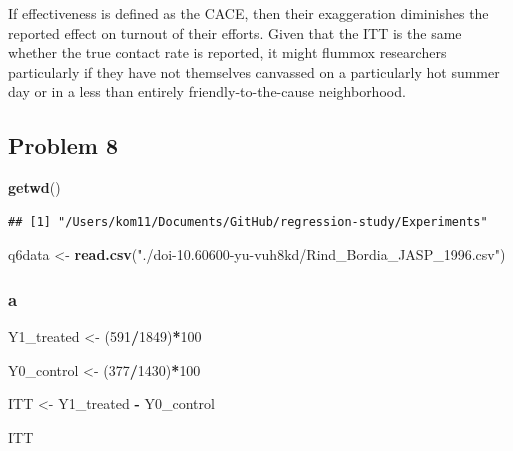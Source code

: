 \documentclass[
]{article}
\newenvironment{Shaded}{\begin{snugshade}}{\end{snugshade}}
\newcommand{\DecValTok}[1]{\textcolor[rgb]{0.00,0.00,0.81}{#1}}
\newcommand{\FunctionTok}[1]{\textcolor[rgb]{0.13,0.29,0.53}{\textbf{#1}}}
\newcommand{\NormalTok}[1]{#1}
\newcommand{\OtherTok}[1]{\textcolor[rgb]{0.56,0.35,0.01}{#1}}
\newcommand{\SpecialCharTok}[1]{\textcolor[rgb]{0.81,0.36,0.00}{\textbf{#1}}}
\newcommand{\StringTok}[1]{\textcolor[rgb]{0.31,0.60,0.02}{#1}}
\begin{document}
If effectiveness is defined as the CACE, then their exaggeration
diminishes the reported effect on turnout of their efforts. Given that
the ITT is the same whether the true contact rate is reported, it might
flummox researchers particularly if they have not themselves canvassed
on a particularly hot summer day or in a less than entirely
friendly-to-the-cause neighborhood.

\subsection{Problem 8}\label{problem-8}

\begin{Shaded}
\begin{Highlighting}[]
\FunctionTok{getwd}\NormalTok{()}
\end{Highlighting}
\end{Shaded}

\begin{verbatim}
## [1] "/Users/kom11/Documents/GitHub/regression-study/Experiments"
\end{verbatim}

\begin{Shaded}
\begin{Highlighting}[]
\NormalTok{q6data }\OtherTok{\textless{}{-}} \FunctionTok{read.csv}\NormalTok{(}\StringTok{"./doi{-}10.60600{-}yu{-}vuh8kd/Rind\_Bordia\_JASP\_1996.csv"}\NormalTok{)}
\end{Highlighting}
\end{Shaded}

\subsubsection{a}\label{a-3}

\begin{Shaded}
\begin{Highlighting}[]
\NormalTok{Y1\_treated }\OtherTok{\textless{}{-}}\NormalTok{ (}\DecValTok{591}\SpecialCharTok{/}\DecValTok{1849}\NormalTok{)}\SpecialCharTok{*}\DecValTok{100}

\NormalTok{Y0\_control }\OtherTok{\textless{}{-}}\NormalTok{ (}\DecValTok{377}\SpecialCharTok{/}\DecValTok{1430}\NormalTok{)}\SpecialCharTok{*}\DecValTok{100}

\NormalTok{ITT }\OtherTok{\textless{}{-}}\NormalTok{ Y1\_treated }\SpecialCharTok{{-}}\NormalTok{ Y0\_control}

\NormalTok{ITT}
\end{Highlighting}
\end{Shaded}
\end{document}
